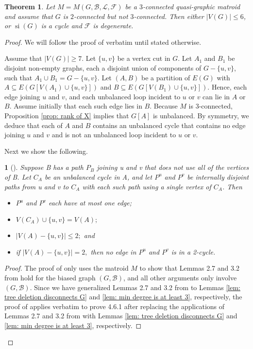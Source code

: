 \documentclass[12pt]{article}
\newtheorem{theorem}{Theorem}[section]
\theoremstyle{definition}
\theoremstyle{plain} %
\newtheorem{subtheorem}{}[theorem]
\newcommand{\cB}{\mathcal{B}}
\newcommand{\cF}{\mathcal{F}}
\newcommand{\cL}{\mathcal{L}}
\DeclareMathOperator{\si}{si}
\begin{document}
\begin{theorem} \label{thm: 3-connected quasi matroid with G 2 connected}
Let $M = M(G, \cB, \cL, \cF)$ be a $3$-connected quasi-graphic matroid and assume that $G$ is $2$-connected but not $3$-connected.
Then either $|V(G)| \le 6$, or $\si(G)$ is a cycle and $\cF$ is degenerate.
\end{theorem}
\begin{proof}

We will follow the proof of \cite[Theorem 3.5]{Fife-Mayhew-Oxley-Semple2020} verbatim until stated otherwise.

Assume that $|V(G)| \geq 7$. Let $\{u,v\}$ be a vertex cut in $G$. Let $A_1$ and $B_1$ be disjoint non-empty graphs, each a disjoint union of components of $G-\{u,v\}$, such that $A_1 \cup B_1 = G - \{u,v\}$. Let $(A,B)$ be a partition of $E(G)$ with $A \subseteq E(G[V(A_1) \cup \{u,v\}])$ and $B \subseteq E(G[V(B_1) \cup \{u,v\}])$. Hence, each edge joining $u$ and $v$, and each unbalanced loop incident to $u$ or $v$ can lie in $A$ or $B$. Assume initially that each such edge lies in $B$. Because $M$ is 3-connected, Proposition \ref{prop: rank of X} implies that $G[A]$ is unbalanced. By symmetry, we deduce that each of $A$ and $B$ contains an unbalanced cycle that contains no edge joining $u$ and $v$ and is not an unbalanced loop incident to $u$ or $v$. 

Next we show the following.

\begin{subtheorem}[{\cite[3.5.1]{Fife-Mayhew-Oxley-Semple2020}}]\label{sub:B has a path P_B}
    Suppose B has a path $P_{B}$ joining u and v that does not use all of the vertices of B. Let $C_{A}$ be an unbalanced cycle in A, and let $P^u$ and $P^v$ be internally disjoint paths from u and v to $C_A$ with each such path using a single vertex of $C_A$. Then
    \begin{itemize}
        \item[$(i)$] $P^u$ and $P^v$ each have at most one edge;
        \item[$(ii)$] $V(C_A)\cup \{u,v\}=V(A);$
        \item[$(iii)$] $\lvert V(A)-\{u,v\}\rvert \leq2;$ and
        \item[$(iv)$] if $\lvert V(A)-\{u,v\}\rvert =2,$ then no edge in $P^u$ and $P^v$ is in a 2-cycle.
    \end{itemize}
\end{subtheorem}
\begin{proof}
The proof of \cite[3.5.1]{Fife-Mayhew-Oxley-Semple2020} only uses the matroid $M$ to show that Lemmas 2.7 and 3.2 from \cite{Fife-Mayhew-Oxley-Semple2020} hold for the biased graph $(G, \cB)$, and all other arguments only involve $(G, \cB)$.
Since we have generalized Lemmas 2.7 and 3.2 from \cite{Fife-Mayhew-Oxley-Semple2020} to Lemmas \ref{lem: tree deletion disconnects G} and \ref{lem: min degree is at least 3}, respectively, the proof of \cite[3.5.1]{Fife-Mayhew-Oxley-Semple2020} applies verbatim to prove 4.6.1 after replacing the applications of Lemmas 2.7 and 3.2 from \cite{Fife-Mayhew-Oxley-Semple2020} with Lemmas \ref{lem: tree deletion disconnects G} and \ref{lem: min degree is at least 3}, respectively.
\end{proof}


\end{proof}
\end{document}
